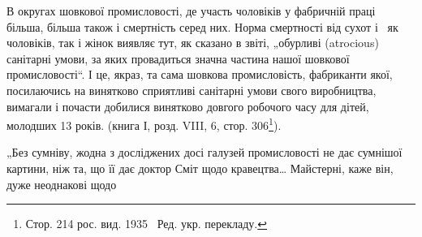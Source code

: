 \noindent{}В округах шовкової промисловості, де участь чоловіків
у фабричній праці більша, більша також і смертність серед них.
Норма смертності від сухот і~ як чоловіків, так і жінок
виявляє тут, як сказано в звіті, „обурливі (atrocious) санітарні
умови, за яких провадиться значна частина нашої шовкової
промисловості“. І це, якраз, та сама шовкова промисловість,
фабриканти якої, посилаючись на винятково сприятливі санітарні умови свого виробництва, вимагали і
почасти добилися
винятково довгого робочого часу для дітей, молодших 13 років.
(книга І, розд. VIII, 6, стор. 306\footnote*{Стор. 214 рос. вид. 1935~ Ред. укр. перекладу.}).

„Без сумніву, жодна з досліджених досі галузей промисловості
не дає сумнішої картини, ніж та, що її дає доктор Сміт
щодо кравецтва\dots{} Майстерні, каже він, дуже неоднакові щодо

\parbreak{}  %
